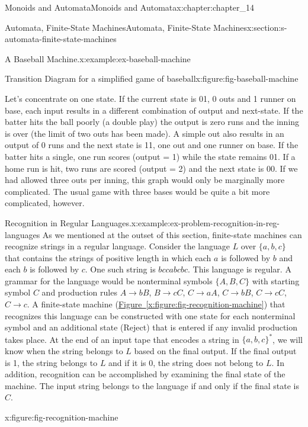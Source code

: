 \documentclass[oneside,10pt,]{book}
\newcommand{\xreffont}{\relax}
\numberwithin{equation}{section}
\begin{document}
\begin{chapterptx}{Monoids and Automata}{}{Monoids and Automata}{}{}{x:chapter:chapter_14}
\begin{sectionptx}{Automata, Finite-State Machines}{}{Automata, Finite-State Machines}{}{}{x:section:s-automata-finite-state-machines}
\begin{example}{A Baseball Machine.}{x:example:ex-baseball-machine}
\begin{figureptx}{Transition Diagram for a simplified game of baseball}{x:figure:fig-baseball-machine}{}
\begin{image}{0.15}{0.7}{0.15}
\end{image}%
\tcblower
\end{figureptx}%
Let's concentrate on one state. If the current state is 01, 0 outs and 1 runner on base, each input results in a different combination of output and next-state. If the batter hits the ball poorly (a double play) the output is zero runs and the inning is over (the limit of two outs has been made). A simple out also results in an output of 0 runs and the next state is 11, one out and one runner on base. If the batter hits a single, one run scores (output = 1) while the state remains 01. If a home run is hit, two runs are scored (output = 2) and the next state is 00. If we had allowed three outs per inning, this graph would only be marginally more complicated. The usual game with three bases would be quite a bit more complicated, however.%
\end{example}
\begin{example}{Recognition in Regular Languages.}{x:example:ex-problem-recognition-in-reg-languages}%
As we mentioned at the outset of this section, finite-state machines can recognize strings in a regular language. Consider the language \(L\) over \(\{a,b,c\}\) that contains the strings of positive length in which each \(a\) is followed by \(b\) and each \(b\) is followed by \(c\). One such string is \(bccabcbc\). This language is regular. A grammar for the language would be nonterminal symbols \(\{A,B,C\}\) with starting symbol \(C\) and production rules \(A\to bB\), \(B\to cC\), \(C\to aA\), \(C\to bB\), \(C \to cC\), \(C \to c\). A finite-state machine (\hyperref[x:figure:fig-recognition-machine]{Figure~{\xreffont\ref{x:figure:fig-recognition-machine}}}) that recognizes this language can be constructed with one state for each nonterminal symbol and an additional state (Reject) that is entered if any invalid production takes place. At the end of an input tape that encodes a string in \(\{a,b,c\}^*\), we will know when the string belongs to \(L\) based on the final output. If the final output is 1, the string belongs to \(L\) and if it is 0, the string does not belong to \(L\). In addition, recognition can be accomplished by examining the final state of the machine. The input string belongs to the language if and only if the final state is \(C\).%
\begin{figureptx}{}{x:figure:fig-recognition-machine}{}%
\begin{image}{0.15}{0.7}{0.15}%

\end{image}
\end{figureptx}
\end{example}
\end{sectionptx}
\end{chapterptx}
\end{document}
